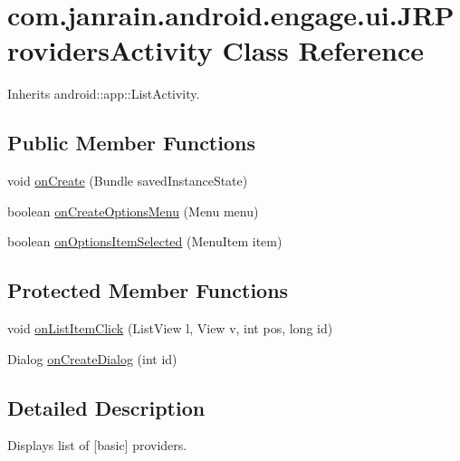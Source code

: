\hypertarget{classcom_1_1janrain_1_1android_1_1engage_1_1ui_1_1_j_r_providers_activity}{
\section{com.janrain.android.engage.ui.JRProvidersActivity Class Reference}
\label{classcom_1_1janrain_1_1android_1_1engage_1_1ui_1_1_j_r_providers_activity}
}


Inherits android::app::ListActivity.

\subsection*{Public Member Functions}
\begin{DoxyCompactItemize}
\item 
void \hyperlink{classcom_1_1janrain_1_1android_1_1engage_1_1ui_1_1_j_r_providers_activity_a61322f62d361b2715f0a38c40636e240}{onCreate} (Bundle savedInstanceState)
\item 
boolean \hyperlink{classcom_1_1janrain_1_1android_1_1engage_1_1ui_1_1_j_r_providers_activity_a7a42d6877364c93d6d726b124e7f41f9}{onCreateOptionsMenu} (Menu menu)
\item 
boolean \hyperlink{classcom_1_1janrain_1_1android_1_1engage_1_1ui_1_1_j_r_providers_activity_aab86a96e89961d5247d758432aa6b571}{onOptionsItemSelected} (MenuItem item)
\end{DoxyCompactItemize}
\subsection*{Protected Member Functions}
\begin{DoxyCompactItemize}
\item 
void \hyperlink{classcom_1_1janrain_1_1android_1_1engage_1_1ui_1_1_j_r_providers_activity_a0ff4e6830d5c7556b31a7b9457736e25}{onListItemClick} (ListView l, View v, int pos, long id)
\item 
Dialog \hyperlink{classcom_1_1janrain_1_1android_1_1engage_1_1ui_1_1_j_r_providers_activity_af6e517992a0b60fbe8210644abff1c0f}{onCreateDialog} (int id)
\end{DoxyCompactItemize}


\subsection{Detailed Description}
Displays list of \mbox{[}basic\mbox{]} providers. 

